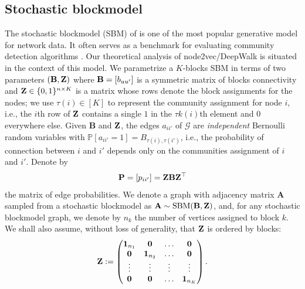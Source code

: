 \documentclass[10pt,journal,compsoc]{IEEEtran}
\newcommand{\ee}{\end{aligned} \end{equation}}
\newcommand{\bds}{\boldsymbol}
\newcommand{\tp}{^\top}
\newcommand{\bee}{\begin{equation}\begin{aligned}}
\newcommand{\M}[1]{{{\mathbf{\MakeUppercase{#1}}}}}
\numberwithin{equation}{section}
\begin{document}
\subsection{Stochastic blockmodel}\label{sec:sbm}
The stochastic blockmodel (SBM) of \cite{holland1983stochastic} is one of the
  most popular generative model for network data. It often serves as a benchmark for evaluating community detection algorithms \cite{abbe2017community}. Our
  theoretical analysis of node2vec/DeepWalk is situated in the context of this model. We parametrize 
  a $K$-blocks SBM in terms of two parameters $(\M B, \M
  Z )$ where $\M B = [b_{uu'}]$ is a
  symmetric matrix of blocks connectivity and $\M Z
  \in \{0,1\}^{n\times K}$ is a matrix whose rows denote the block
  assignments for the nodes; we use $\tau(i)\in [K]$ to represent
  the community assignment for node $i$, i.e., the $i$th row of $\M
  Z$ contains a single $1$ in the $\tau{k}(i)$th element and $0$
  everywhere else. Given $\mathbf{B}$ and $\M Z$, the edges
  $a_{ii'}$ of $\mathcal{G}$ are {\em independent} Bernoulli random
  variables with $\mathbb{P}[a_{ii'} = 1] = B_{\tau(i),\tau(i')}$, i.e., the probability of
  connection between $i$ and $i'$ depends only on the communities
  assignment of $i$ and $i'$. Denote by 
\bee\label{SBM:P}
\M P = [p_{ii'}] = \M
  Z \M B \M Z\tp
\ee the matrix of edge probabilities. We
  denote a graph with adjacency matrix $\mathbf{A}$ sampled from a
  stochastic blockmodel as $\mathbf{A} \sim \mathrm{SBM}(\mathbf{B},
  \M Z)$, and, for any stochastic blockmodel graph, we denote
  by $n_{k}$ the number of vertices assigned to block $k$. %
  We shall also assume, without
loss of generality, that $\M Z$ is ordered by blocks: 
\bee\label{theta}
\M Z := \begin{pmatrix}
\bds 1_{n_1} & \bds 0 & \dots
 & \bds 0
\\
\bds 0 & \bds 1_{n_2} & 
\dots & \bds 0
\\
\vdots & \vdots & \vdots & \vdots
\\
\bds 0 & \bds 0 & \dots & \bds 1_{n_K}
\end{pmatrix}.
\ee
\end{document}
